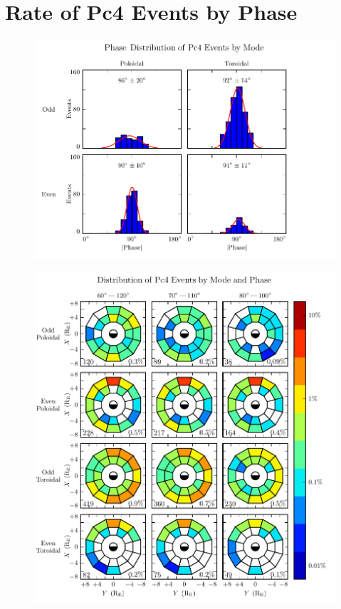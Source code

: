 \section{Rate of Pc4 Events by Phase}
  \label{sec_phase}




\begin{figure}[!htb]
    \centering
    \includegraphics[width=\textwidth]{figures/phase.pdf}
    \caption[TEST FIGURE]{
      \todo{$\cdots$}
    }
    \label{fig_phase}
\end{figure}


\begin{figure}[!htb]
    \centering
    \includegraphics[width=\textwidth]{figures/mode_phase.pdf}
    \caption[TEST FIGURE]{
      \todo{$\cdots$}
    }
    \label{fig_mode_phase}
\end{figure}


